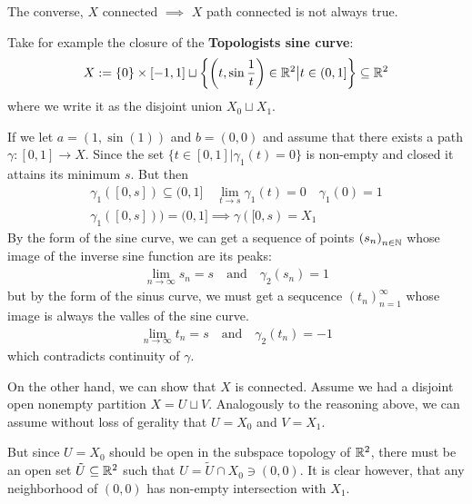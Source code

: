 \begin{ex}
  The converse, $X$ connected $\implies$ $X$ path connected is not always true.

  Take for example the closure of the \textbf{Topologists sine curve}:
  \begin{align*}
    X := \{0\} \times [-1,1] 
    \sqcup 
    \left\{\left(t, \sin \frac{1}{t}\right)
    \in \mathbb{R}^{2}\big\vert t \in (0,1]\right\} \subseteq \mathbb{R}^{2}
  \end{align*}
  where we write it as the disjoint union $X_0\sqcup X_1$.

  If we let $a = (1,\sin(1))$ and $b = (0,0)$ and assume that there exists a path $\gamma:[0,1] \to X$. Since the set $\{t \in [0,1] \big\vert \gamma_1(t) = 0\}$ is non-empty and closed it attains its minimum $s$. But then
  \begin{align*}
    \gamma_1([0,s]) \subseteq (0,1] \quad \lim_{t \to s} \gamma_1(t) = 0 \quad \gamma_1(0) = 1\\
    \gamma_1([0,s])) = (0,1] \implies \gamma([0,s) = X_1
  \end{align*}
  By the form of the sine curve, we can get a sequence of points $\left(s_{n}\right)_{n \in \mathbb{N}}$ whose image of the inverse sine function are its peaks:
  \begin{align*}
    \lim_{n \to \infty}s_n = s \quad \text{and} \quad \gamma_2(s_n) = 1
  \end{align*}
  but by the form of the sinus curve, we must get a sequcence $\left(t_{n}\right)_{n = 1}^{\infty}$ whose image is always the valles of the sine curve.
  \begin{align*}
    \lim_{n \to \infty} t_n = s \quad \text{and} \quad \gamma_2(t_n) = -1
  \end{align*}
  which contradicts continuity of $\gamma$.


  On the other hand, we can show that $X$ is connected. Assume we had a disjoint open nonempty partition $X = U \sqcup V$.
  Analogously to the reasoning above, we can assume without loss of gerality that $U = X_0$ and $V = X_1$.

  But since $U = X_0$ should be open in the subspace topology of $\mathbb{R}^{2}$, there must be an open set $\tilde{U} \subseteq \mathbb{R}^{2}$ such that $U = \tilde{U} \cap X_0 \ni (0,0)$. 
  It is clear however, that any neighborhood of $(0,0)$ has non-empty intersection with $X_1$.
\end{ex}


